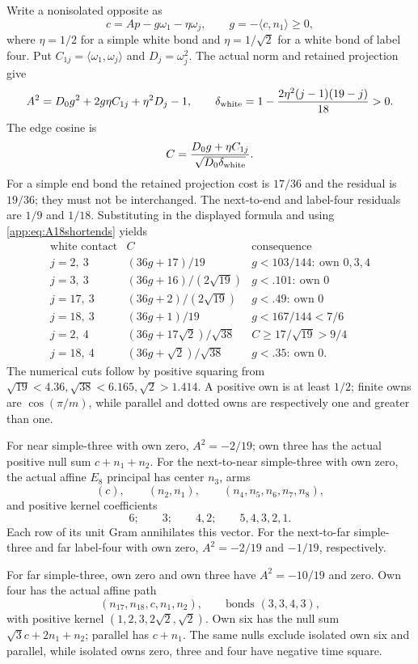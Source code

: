 \documentclass[11pt]{article}
\theoremstyle{definition}
\theoremstyle{remark}
\newcommand{\ip}[2]{\langle #1,#2\rangle}
\begin{document}
Write a nonisolated opposite as
\[
 c=A p-g\omega_1-\eta\omega_j,\qquad g=-\ip c{n_1}\geq0,
\]
where \(\eta=1/2\) for a simple white bond and \(\eta=1/\sqrt2\)
for a white bond of label four. Put \(C_{1j}=\ip{\omega_1}{\omega_j}\)
and \(D_j=\omega_j^2\). The actual norm and retained projection give
\[
 A^2=D_0g^2+2g\eta C_{1j}+\eta^2D_j-1,\qquad
 \delta_{\rm white}
 =1-\frac{2\eta^2(j-1)(19-j)}{18}>0.
\]
The edge cosine is
\[
 C=\frac{D_0g+\eta C_{1j}}{\sqrt{D_0\delta_{\rm white}}}.
\]
For a simple end bond the retained projection cost is \(17/36\)
and the residual is \(19/36\); they must not be interchanged.
The next-to-end and label-four residuals are \(1/9\) and \(1/18\).
Substituting in the displayed formula and using
\eqref{app:eq:A18shortends} yields
\[
\begin{array}{c|c|l}
\text{white contact}&C&\text{consequence}\\ \hline
j=2,\ 3&(36g+17)/19&g<103/144:\ \text{own }0,3,4\\
j=3,\ 3&(36g+16)/(2\sqrt{19})&g<.101:\ \text{own }0\\
j=17,\ 3&(36g+2)/(2\sqrt{19})&g<.49:\ \text{own }0\\
j=18,\ 3&(36g+1)/19&g<167/144<7/6\\
j=2,\ 4&(36g+17\sqrt2)/\sqrt{38}&C\geq17/\sqrt{19}>9/4\\
j=18,\ 4&(36g+\sqrt2)/\sqrt{38}&g<.35:\ \text{own }0 .
\end{array}
\]
The numerical cuts follow by positive squaring from
\(\sqrt{19}<4.36,\sqrt{38}<6.165,\sqrt2>1.414\).
A positive own is at least \(1/2\); finite owns are
\(\cos(\pi/m)\), while parallel and dotted owns are respectively
one and greater than one.

For near simple-three with own zero, \(A^2=-2/19\); own three has
the actual positive null sum \(c+n_1+n_2\). For the next-to-near
simple-three with own zero, the actual affine \(E_8\) principal
has center \(n_3\), arms
\[
 (c),\qquad(n_2,n_1),\qquad(n_4,n_5,n_6,n_7,n_8),
\]
and positive kernel coefficients
\[
 6;\qquad3;\qquad4,2;\qquad5,4,3,2,1.
\]
Each row of its unit Gram annihilates this vector. For the
next-to-far simple-three and far label-four with own zero,
\(A^2=-2/19\) and \(-1/19\), respectively.

For far simple-three, own zero and own three have
\(A^2=-10/19\) and zero. Own four has the actual affine path
\[
 (n_{17},n_{18},c,n_1,n_2),\qquad
 \text{bonds }(3,3,4,3),
\]
with positive kernel \((1,2,3,2\sqrt2,\sqrt2)\).
Own six has the null sum \(\sqrt3c+2n_1+n_2\);
parallel has \(c+n_1\). The same nulls exclude isolated
own six and parallel, while isolated owns zero, three and four
have negative time square.
\end{document}
